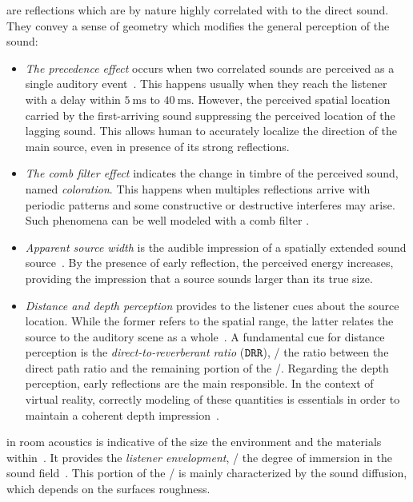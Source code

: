  are reflections which are by nature highly correlated with to the direct sound.
They convey a sense of geometry which modifies the general perception of the sound:
\begin{itemize}
    \item \textit{The precedence effect} occurs when two correlated sounds are perceived as a single auditory event~.
    This happens usually when they reach the listener with a delay within $\SI{5}{\ms}$ to $\SI{40}{\ms}$.
    However, the perceived spatial location carried by the first-arriving sound suppressing the perceived location of the lagging sound.
    This allows human to accurately localize the direction of the main source, even in presence of its strong reflections.
    \item \textit{The comb filter effect} indicates the change in timbre of the perceived sound, named \textit{coloration}.
    This happens when multiples reflections arrive with periodic patterns and some constructive or destructive interferes may arise.
    Such phenomena can be well modeled with a comb filter .
    \item \textit{Apparent source width} is the audible impression of a spatially extended sound source~.
    By the presence of early reflection, the perceived energy increases, providing the impression that a source sounds larger than its true size.
    \item \textit{Distance and depth perception} provides to the listener cues about the source location.
    While the former refers to the spatial range, the latter relates the source to the auditory scene as a whole~.
    A fundamental cue for distance perception is the \textit{direct-to-reverberant ratio} ($\mathtt{DRR}$),
    \ie/ the ratio between the direct path ratio and the remaining portion of the \RIR/.
    Regarding the depth perception, early reflections are the main responsible.
    In the context of virtual reality, correctly modeling of these quantities is essentials in order to maintain a coherent depth impression~.
\end{itemize}

 in room acoustics is indicative of the size the environment and the materials within~.
It provides the \textit{listener envelopment}, \ie/ the degree of immersion in the sound field~.
This portion of the \RIR/ is mainly characterized by the sound diffusion, which depends on the surfaces roughness.

